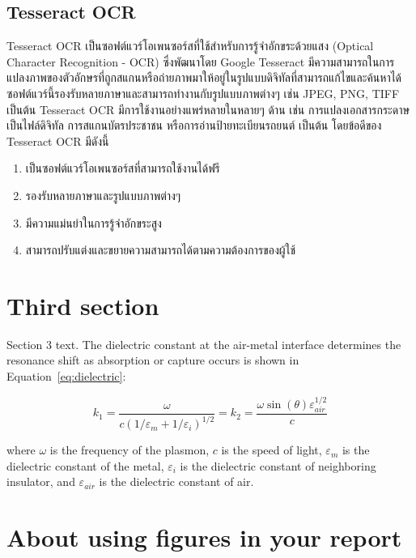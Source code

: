   \subsection{Tesseract OCR}
    \qquad Tesseract OCR เป็นซอฟต์แวร์โอเพนซอร์สที่ใช้สำหรับการรู้จำอักขระด้วยแสง 
    (Optical Character Recognition - OCR) ซึ่งพัฒนาโดย Google Tesseract
    มีความสามารถในการแปลงภาพของตัวอักษรที่ถูกสแกนหรือถ่ายภาพมาให้อยู่ในรูปแบบดิจิทัลที่สามารถแก้ไขและค้นหาได้
    ซอฟต์แวร์นี้รองรับหลายภาษาและสามารถทำงานกับรูปแบบภาพต่างๆ เช่น JPEG, PNG, TIFF เป็นต้น Tesseract OCR
    มีการใช้งานอย่างแพร่หลายในหลายๆ ด้าน เช่น การแปลงเอกสารกระดาษเป็นไฟล์ดิจิทัล การสแกนบัตรประชาชน
    หรือการอ่านป้ายทะเบียนรถยนต์ เป็นต้น โดยข้อดีของ Tesseract OCR มีดังนี้ \cite{Tesseract}
    \begin{enumerate}
      \item เป็นซอฟต์แวร์โอเพนซอร์สที่สามารถใช้งานได้ฟรี
      \item รองรับหลายภาษาและรูปแบบภาพต่างๆ
      \item มีความแม่นยำในการรู้จำอักขระสูง
      \item สามารถปรับแต่งและขยายความสามารถได้ตามความต้องการของผู้ใช้
    \end{enumerate}

\section{Third section}
Section 3 text. The dielectric constant
at the air-metal interface determines
the resonance shift as absorption or capture occurs
is shown in Equation~\eqref{eq:dielectric}:

\begin{equation}\label{eq:dielectric}
k_1=\frac{\omega}{c({1/\varepsilon_m + 1/\varepsilon_i})^{1/2}}=k_2=\frac{\omega
\sin(\theta)\varepsilon_\mathit{air}^{1/2}}{c}
\end{equation}

\noindent
where $\omega$ is the frequency of the plasmon, $c$ is the speed of
light, $\varepsilon_m$ is the dielectric constant of the metal,
$\varepsilon_i$ is the dielectric constant of neighboring insulator,
and $\varepsilon_\mathit{air}$ is the dielectric constant of air.

\section{About using figures in your report}

